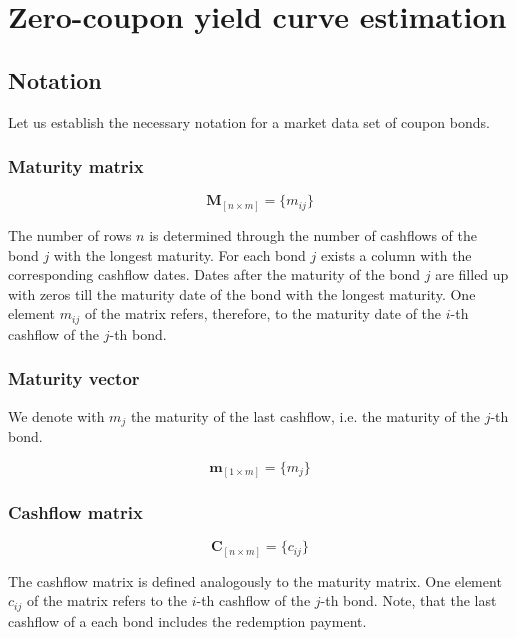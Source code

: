\section{Zero-coupon yield curve estimation}

\subsection{Notation}
\label{sec:notation}

Let us establish the necessary notation for a market data set of coupon bonds.

\subsubsection*{Maturity matrix}

\begin{equation}\label{maturitym}
\bm{M}_{\left[n\times m\right]}= \{m_{ij}\}
\end{equation}

The number of rows $n$ is determined through the number of cashflows of the bond $j$ with the longest maturity. For each bond $j$ exists a column with the corresponding cashflow dates. Dates after the maturity of the bond $j$ are filled up with zeros till the maturity date of the bond with the longest maturity. One element $m_{ij}$ of the matrix  refers, therefore, to the maturity date of  the $i$-th cashflow of the $j$-th bond. 

\subsubsection*{Maturity vector}

We denote with $m_j$ the maturity of the last cashflow, i.e. the maturity of the $j$-th bond.

\begin{equation}\label{weights}
    \bm{m}_{\left[1\times m\right]}= \{m_j\}
\end{equation}

\subsubsection*{Cashflow matrix}

 \begin{equation}\label{cashflowm}
\bm{C}_{\left[n\times m\right]}= \{c_{ij}\}
\end{equation}

 The cashflow matrix is defined analogously to the maturity matrix.  One element $c_{ij}$  of the matrix refers to the $i$-th cashflow of the $j$-th bond. Note, that the last cashflow of a each bond includes the redemption payment.

